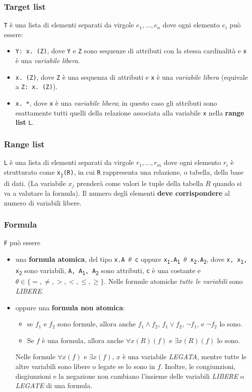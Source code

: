 \documentclass{report}
\begin{document}
\subsubsection{Target list}
\texttt{T} \`e una lista di elementi separati da virgole $e_1, \dots, e_n$ dove ogni elemento $e_i$ pu\`o essere:
\begin{itemize}
	\item \texttt{Y: x. (Z)}, dove \texttt{Y} e \texttt{Z} sono sequenze di attributi con la stessa cardinalit\`a e \texttt{x} \`e una \emph{variabile libera}.
	\item \texttt{x. (Z)}, dove \texttt{Z} \`e una sequenza di attributi e \texttt{x} \`e una \emph{variabile libera} (equivale a \texttt{Z: x. (Z)}). 
	\item \texttt{x. *}, dove \texttt{x} \`e una \emph{variabile libera}; in questo caso gli attributi sono esattamente tutti quelli della relazione associata alla variabile \texttt{x} nella \textbf{range list} \texttt{L}.
\end{itemize}

\subsubsection{Range list}
\texttt{L} \`e una lista di elementi separati da virgole $r_1, \dots, r_m$ dove ogni elemento $r_i$ \`e strutturato come \texttt{x\textsubscript{j}(R)}, in cui \texttt{R} rappresenta una relazione, o tabella, della base di dati. (La variabile $x_j$ prender\`a come valori le tuple della tabella $R$ quando si va a valutare la formula).
Il numero degli elementi \textbf{deve corrispondere} al numero di variabili libere.

\subsubsection{Formula}
\texttt{F} pu\`o essere 
\begin{itemize}
	\item una \textbf{formula atomica}, del tipo \texttt{x.A $\theta$ c} oppure \texttt{x\textsubscript{1}.A\textsubscript{1} $\theta$ x\textsubscript{2}.A\textsubscript{2}}, dove \texttt{x, x\textsubscript{1}, x\textsubscript{2}} sono variabili, \texttt{A, A\textsubscript{1}, A\textsubscript{2}} sono attributi, \texttt{c} \`e una costante e $\theta \in \{ =, \ne, >, <, \le, \ge\}$. Nelle formule atomiche \emph{tutte le variabili} sono \emph{LIBERE}.
	\item oppure una \textbf{formula non atomica}:
	\begin{itemize}
		\item se $f_1$ e $f_2$ sono formule, allora anche $f_1 \wedge f_2$, $f_1 \vee f_2$, $\neg f_1$, e $\neg f_2$ lo sono.
		\item Se $f$ \`e una formula, allora anche $\forall x(R) (f)$ e $\exists x (R) (f)$ lo sono. 
	\end{itemize}
	Nelle formule $\forall x (f)$ e $\exists x(f)$, $x$ \`e una variabile \emph{LEGATA}, mentre tutte le altre variabili sono libere o legate se lo sono in $f$.
Inoltre, le congiunzioni, disgiunzioni e la negazione non cambiano l'insieme delle variabili \emph{LIBERE} o \emph{LEGATE} di una formula.
\end{itemize}
\end{document}
